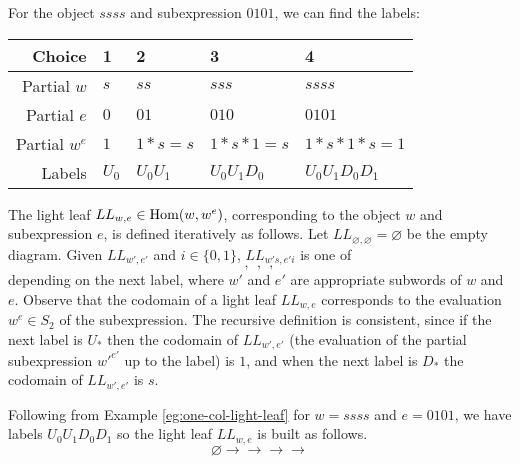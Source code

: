 \begin{example} \label{eg:one-col-light-leaf}
    For the object $ssss$ and subexpression $0101$, we can find the labels:
    \begin{center}
        \begin{tabular}{ |r||p{6em}|p{6em}|p{6em}|p{6em}| }
            \hline
            Choice        & 1     & 2         & 3             & 4                 \\ \hline
            Partial $w$   & $s$   & $ss$      & $sss$         & $ssss$            \\ \hline
            Partial $e$   & $0$   & $01$      & $010$         & $0101$            \\ \hline
            Partial $w^e$ & $1$   & $1*s = s$ & $1*s*1=s$     & $1*s*1*s=1$       \\ \hline
            Labels        & $U_0$ & $U_0 U_1$ & $U_0 U_1 D_0$ & $U_0 U_1 D_0 D_1$ \\ \hline
        \end{tabular}
    \end{center}
\end{example}

The light leaf $LL_{w,e} \in \operatorname{Hom}(w, w^e)$, corresponding to the object $w$ and subexpression $e$, is defined iteratively as follows. Let $LL_{\varnothing,\varnothing} = \varnothing$ be the empty diagram. Given $LL_{w',e'}$ and $i \in \{0,1\}$, $LL_{w's,e'i}$ is one of
\begin{equation}
     \:,\:
     \:,\:
     \:,\:
    
\end{equation}
depending on the next label, where $w'$ and $e'$ are appropriate subwords of $w$ and $e$. Observe that the codomain of a light leaf $LL_{w,e}$ corresponds to the evaluation $w^e \in S_2$ of the subexpression. The recursive definition is consistent, since if the next label is $U_*$ then the codomain of $LL_{w',e'}$ (the evaluation of the partial subexpression $w'^{e'}$ up to the label) is $1$, and when the next label is $D_*$ the codomain of $LL_{w',e'}$ is $s$. 

\begin{example}
    Following from Example \eqref{eg:one-col-light-leaf} for $w = ssss$ and $e = 0101$, we have labels $U_0 U_1 D_0 D_1$ so the light leaf $LL_{w,e}$ is built as follows.
    \[
        \varnothing
        \to 
        \to 
        \to 
        \to 
    \]
\end{example}

